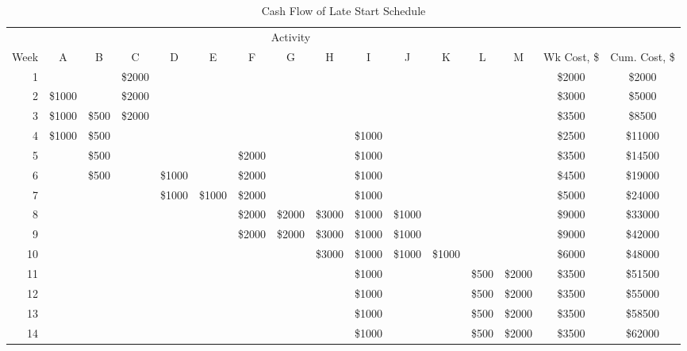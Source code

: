 \documentclass{article}
\begin{document}
		{\renewcommand{\arraystretch}{1.2} 
	\begin{sidewaystable}[!htbp]
  		\begin{center}
    		\caption{Cash Flow of Late Start Schedule}
    		\label{tab:table2}
			
    		\begin{tabular}{rccccccccccccccc}
				 & \multicolumn{13}{c}{Activity} &  &  \\
				Week & A & B & C & D & E & F & G & H & I & J & K & L & M & Wk Cost, \$ & Cum. Cost, \$\\
				\hline
      			1 &  &  & \$2000 &\multicolumn{10}{c}{} & \$2000 & \$2000\\
      			2 & \$1000 &  & \$2000 &\multicolumn{10}{c}{} & \$3000 & \$5000\\
				3 & \$1000 & \$500 & \$2000 &\multicolumn{10}{c}{} & \$3500 & \$8500\\
				4 &    \$1000    & \$500 &        & & & & & & \$1000 & \multicolumn{4}{c}{} &\$2500 & \$11000\\
				5 & & \$500 & & &  & \$2000 &  &  & \$1000 & \multicolumn{4}{c}{} & \$3500 & \$14500\\
				6 & & \$500 & & \$1000 && \$2000 &  &  & \$1000 &  & \multicolumn{3}{c}{} & \$4500 & \$19000\\
				7 &\multicolumn{3}{c}{}&  \$1000& \$1000 & \$2000 & &  & \$1000 & & \multicolumn{3}{c}{} & \$5000 & \$24000\\
				8 &\multicolumn{5}{c}{} & \$2000 & \$2000&  \$3000& \$1000 & \$1000& \multicolumn{3}{c}{} & \$9000 & \$33000\\
				9 &\multicolumn{5}{c}{} & \$2000&\$2000&  \$3000& \$1000 & \$1000& & & & \$9000 & \$42000\\
				10 &\multicolumn{7}{c}{}&\$3000 & \$1000 & \$1000&  \$1000& & & \$6000 & \$48000\\
				11 &\multicolumn{8}{c}{} & \$1000 & &  &\$500 & \$2000& \$3500 & \$51500\\
				12 &\multicolumn{8}{c}{} & \$1000 & &  &\$500 & \$2000& \$3500 & \$55000\\
				13 &\multicolumn{8}{c}{} & \$1000 & &  &\$500 & \$2000& \$3500 & \$58500\\
				14 &\multicolumn{8}{c}{} & \$1000 & &  & \$500& \$2000 & \$3500 & \$62000\\
				\hline
    		\end{tabular}
  		\end{center}
	\end{sidewaystable}
	}
	
\end{document}
